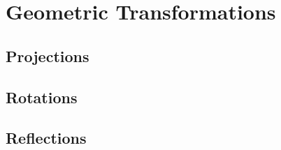 \documentclass[12pt]{article}
\begin{document}
	
\pagebreak
\section{Geometric Transformations}
\begin{center} \end{center}
	\subsection{Projections}
	\begin{center} \end{center}
	
	
	
	\subsection{Rotations}
	\begin{center} \end{center}
	
	\subsection{Reflections}
	\begin{center} \end{center}




	
	
	
\end{document}
